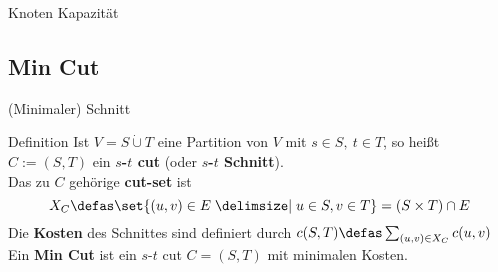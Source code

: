 \begin{frame}{Knoten Kapazität}
\begin{figure}
    \end{figure}
\end{frame}

\subsection{Min Cut}
\begin{frame}{(Minimaler) Schnitt}
    \begin{block}{Definition}
        \pause Ist $V = S \mathbin{\dot{\cup}} T$ eine Partition von \(V\) mit \(s \in S, \ t \in T\), so heißt \(C := (S, T)\) ein \textbf{$s$-$t$ cut} (oder \textbf{$s$-$t$ Schnitt}).\\\pause
        Das zu $C$ gehörige \textbf{cut-set} ist
        \[X_C \defas \set{(u, v) \in E \given u \in S, v \in T} = (S\times
        T)\cap E\]
        \pause
        Die \textbf{Kosten} des Schnittes sind definiert durch
        \(c(S, T) \defas \sum\nolimits_{(u, v) \in X_C} c(u, v)\)\\
        \pause Ein \textbf{Min Cut} ist ein $s$-$t$ cut \(C = (S, T)\) mit minimalen Kosten.
    \end{block}
\end{frame}

